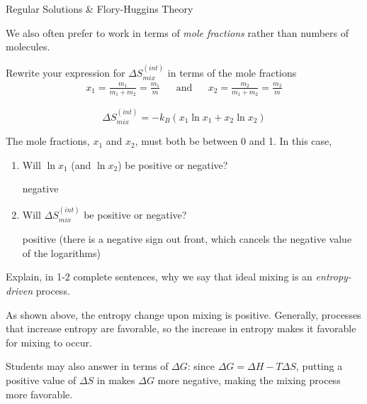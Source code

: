 \begin{activity}{Regular Solutions \& Flory-Huggins Theory}
\begin{ctqs}
	\question We also often prefer to work in terms of \emph{mole fractions} rather than numbers of molecules. \label{ctq:Smixed}
	
		Rewrite your expression for $\Delta S_{mix}^{(int)}$ in terms of the mole fractions
		\begin{align*}
			x_1 = \frac{m_1}{m_1 + m_2} = \frac{m_1}{m} && \text{and} && x_2 = \frac{m_2}{m_1+m_2} = \frac{m_2}{m}
		\end{align*}
		
			\begin{solution}[0.75in]
			
				\begin{equation*}
					\Delta S_{mix}^{(int)} = -k_B\left(x_1 \ln x_1 + x_2 \ln x_2 \right)
				\end{equation*}
			\end{solution}
		
	\question The mole fractions, $x_1$ and $x_2$, must both be between 0 and 1.  In this case,
		\begin{enumerate}
			\item Will $\ln x_1$ (and $\ln x_2$) be positive or negative?
	
				\begin{solution}[1in]
					negative
				\end{solution}
				
			\item Will $\Delta S_{mix}^{(int)}$ be positive or negative? \label{ctq:Spositive}
	
				\begin{solution}[1in]
					positive (there is a negative sign out front, which cancels the negative value of the logarithms)
				\end{solution}
				
		\end{enumerate}
		
	\question Explain, in 1-2 complete sentences, why we say that ideal mixing is an \emph{entropy-driven} process.
	
		\begin{solution}[2.5in]
		
			As shown above, the entropy change upon mixing is positive.  Generally, processes that increase entropy are favorable, so the increase in entropy makes it favorable for mixing to occur.
			
			Students may also answer in terms of $\Delta G$: since $\Delta G = \Delta H - T\Delta S$, putting a positive value of $\Delta S$ in makes $\Delta G$ more negative, making the mixing process more favorable.
		\end{solution}
		

\end{ctqs}
\end{activity}
